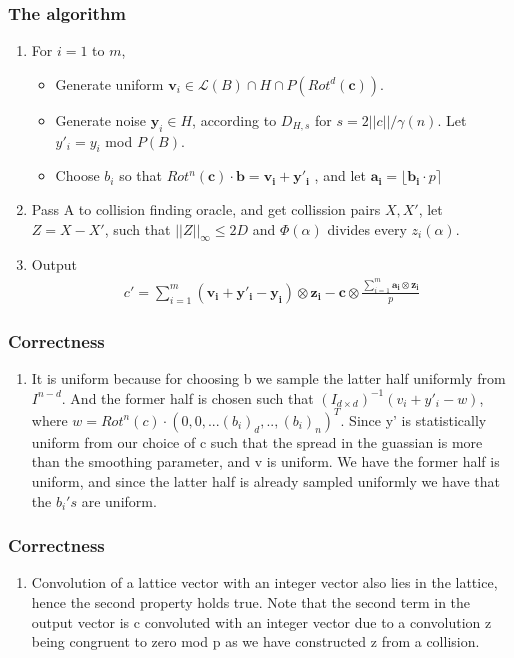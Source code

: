 \documentclass{beamer}
\newcommand{\Latt}{\mathcal{L}}
\begin{document}
\begin{frame}
	\frametitle{The algorithm}
	\begin{enumerate}
		\item For $i = 1$ to $m$,
		\begin{itemize}
			\item Generate uniform $\mathbf{v}_i \in \Latt(B)\cap H \cap P(Rot^d(\mathbf{c}))$. \cite{Micciancio2002}
			\item Generate noise $\mathbf{y}_i \in H$, according to $D_{H,s}$ for $s = 2||c||/\gamma(n)$. Let $y'_i = y_i$ mod $P(B)$.
			\item Choose $b_i$ so that $Rot^n(\mathbf{c}) \cdot \mathbf{b} = \mathbf{v_i} + \mathbf{y'_i}$ , and let $\mathbf{a_i} = \lfloor \mathbf{b_i} \cdot p \rceil $
		\end{itemize}
		\item Pass A to collision finding oracle, and get collission pairs $X,X'$, let $Z = X - X'$, such that $||Z||_\infty \leq 2D$ and $\Phi(\alpha)$ divides every $z_i(\alpha)$.
		\item Output 
		\begin{align*}
		c' = \sum_{i=1}^m(\mathbf{v_i}+\mathbf{y'_i} - \mathbf{y_i}) \otimes \mathbf{z_i} - \mathbf{c} \otimes \frac{\sum_{i=1}^m \mathbf{a_i} \otimes \mathbf{z_i}}{p}
		\end{align*} 	
	\end{enumerate}
\end{frame}
\begin{frame}
	\frametitle{Correctness}
	\begin{enumerate}
		\item It is uniform because for choosing b we sample the latter half uniformly from $I^{n-d}$. And the former half is chosen such that ${(I_{d \times d})}^{-1}(v_i + y'_i - w)$, where $w = Rot^n(c) \cdot {(0,0,...(b_i)_d,..,(b_i)_n)}^T$. Since y' is statistically uniform from our choice of c such that the spread in the guassian is more than the smoothing parameter, and v is uniform. We have the former half is uniform, and since the latter half is already sampled uniformly we have that the $b_i's$ are uniform.
	\end{enumerate}
\end{frame}
\begin{frame}
	\frametitle{Correctness}
	\begin{enumerate}
		\item Convolution of a lattice vector with an integer vector also lies in the lattice, hence the second property holds true. Note that the second term in the output vector is c convoluted with an integer vector due to a convolution z being congruent to zero mod p as we have constructed z from a collision. 
	\end{enumerate}
\end{frame}
\end{document}
